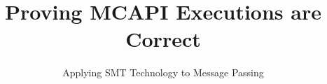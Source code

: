 \documentclass[preprint]{sigplanconf}
\begin{document}
%
\pagestyle{headings}  %
%
\title{Proving MCAPI Executions are Correct}
\subtitle{Applying SMT Technology to Message Passing}

\authorinfo{}%
{}

\maketitle



%
%
\begin{abstract}


\end{abstract}
%






%





\end{document}
